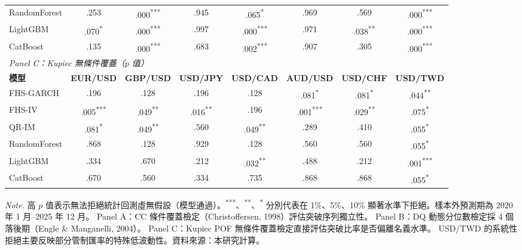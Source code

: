 \begin{table}[htbp]
{\begin{tabular}{lccccccc}
        RandomForest    & .253 & .000\textsuperscript{***} & .945 & .065\textsuperscript{*} & .969 & .569 & .000\textsuperscript{***} \\
        LightGBM        & .070\textsuperscript{*} & .000\textsuperscript{***} & .997 & .000\textsuperscript{***} & .971 & .038\textsuperscript{**} & .000\textsuperscript{***} \\
        CatBoost        & .135 & .000\textsuperscript{***} & .683 & .002\textsuperscript{***} & .907 & .305 & .000\textsuperscript{***} \\
        \hline
        \multicolumn{8}{l}{\textit{Panel C：Kupiec 無條件覆蓋（$p$ 值）}} \\
        \textbf{模型} & \textbf{EUR/USD} & \textbf{GBP/USD} & \textbf{USD/JPY} & \textbf{USD/CAD} & \textbf{AUD/USD} & \textbf{USD/CHF} & \textbf{USD/TWD} \\
        \hline
        FHS-GARCH       & .196 & .128 & .196 & .128 & .081\textsuperscript{*} & .081\textsuperscript{*} & .044\textsuperscript{**} \\
        FHS-IV          & .005\textsuperscript{***} & .049\textsuperscript{**} & .016\textsuperscript{**} & .196 & .001\textsuperscript{***} & .029\textsuperscript{**} & .075\textsuperscript{*} \\
        QR-IM           & .081\textsuperscript{*} & .049\textsuperscript{**} & .560 & .049\textsuperscript{**} & .289 & .410 & .055\textsuperscript{*} \\
        RandomForest    & .868 & .128 & .929 & .128 & .560 & .560 & .055\textsuperscript{*} \\
        LightGBM        & .334 & .670 & .212 & .032\textsuperscript{**} & .488 & .212 & .001\textsuperscript{***} \\
        CatBoost        & .670 & .560 & .334 & .735 & .868 & .868 & .055\textsuperscript{*} \\
        \hline
    \end{tabular}}

    \vspace{3mm}

    \begin{minipage}{\textwidth}
        \fontsize{9pt}{13pt}\selectfont
        \textit{Note.} 高 $p$ 值表示無法拒絕統計回測虛無假設（模型通過）。\textsuperscript{***}、\textsuperscript{**}、\textsuperscript{*} 分別代表在 1\%、5\%、10\% 顯著水準下拒絕。樣本外預測期為 2020 年 1 月--2025 年 12 月。
        Panel A：CC 條件覆蓋檢定（Christoffersen, 1998）評估突破序列獨立性。
        Panel B：DQ 動態分位數檢定採 4 個落後期（Engle \& Manganelli, 2004）。
        Panel C：Kupiec POF 無條件覆蓋檢定直接評估突破比率是否偏離名義水準。
        USD/TWD 的系統性拒絕主要反映部分管制匯率的特殊低波動性。資料來源：本研究計算。
    \end{minipage}
\end{table}

